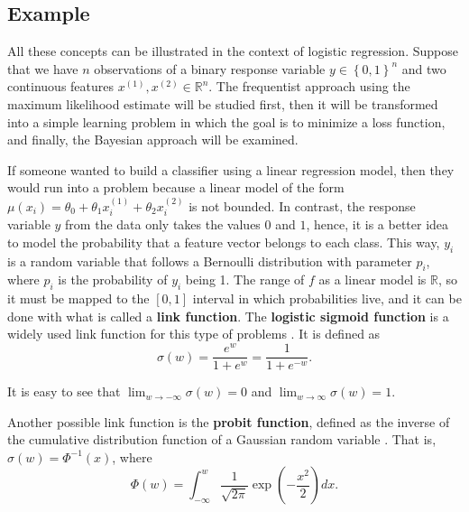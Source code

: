 \subsection{Example}

All these concepts can be illustrated in the context of logistic regression. Suppose that we have $n$ observations of a binary response variable $y \in \left\{0, 1\right\}^n$ and two continuous features $x^{(1)}, x^{(2)} \in \mathbb{R}^n$. The frequentist approach using the maximum likelihood estimate will be studied first, then it will be transformed into a simple learning problem in which the goal is to minimize a loss function, and finally, the Bayesian approach will be examined.

If someone wanted to build a classifier using a linear regression model, then they would run into a problem because a linear model of the form $\mu(x_i) = \theta_0 + \theta_1 x_i^{(1)} + \theta_2 x_i^{(2)}$ is not bounded. In contrast, the response variable $y$ from the data only takes the values $0$ and $1$, hence, it is a better idea to model the probability that a feature vector belongs to each class. This way, $y_i$ is a random variable that follows a Bernoulli distribution with parameter $p_i$, where $p_i$ is the probability of $y_i$ being 1.
The range of $f$ as a linear model is $\mathbb{R}$, so it must be mapped to the $\left[ 0,1 \right]$ interval in which probabilities live, and it can be done with what is called a \textbf{link function}. The \textbf{logistic sigmoid function} %
is a widely used link function for this type of problems \cite[p.~114]{christopher2006pattern}. It is defined as
\begin{equation}
  \sigma(w) = \frac{e^w}{1 + e^w} = \frac{1}{1 + e^{-w}}.
\end{equation}

It is easy to see that $\lim_{w \to -\infty} \sigma(w) = 0$ and $\lim_{w \to \infty} \sigma(w) = 1$.


Another possible link function is the \textbf{probit function}, defined as the inverse of the cumulative distribution function of a Gaussian random variable \cite[p.~296]{friedman2001elements}. That is, $\sigma(w) = \Phi^{-1}\left( x \right)$,
where
\begin{equation}
  \Phi(w) = \int_{-\infty}^w \frac{1}{\sqrt{2 \pi}} \exp{\left( -\frac{x^2}{2} \right)} dx.
\end{equation}

